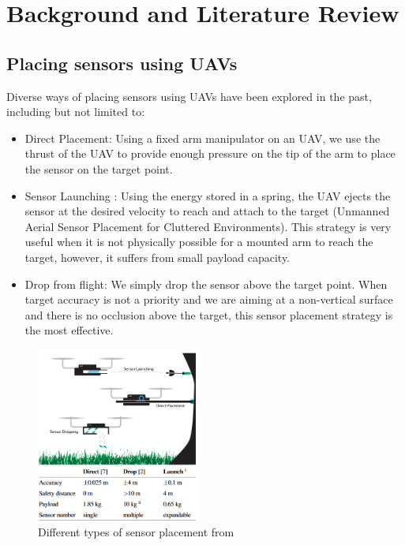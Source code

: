 \section{Background and Literature Review}
\subsection{Placing sensors using UAVs}
Diverse ways of placing sensors using UAVs have been explored in the past, including but not limited to: 
\begin{itemize}
    \item Direct Placement: Using a fixed arm manipulator on an UAV, we use the thrust of the UAV to provide enough pressure on the tip of the arm to place the sensor on the target point.
    \item Sensor Launching \cite{farinha2020unmanned}: Using the energy stored in a spring, the UAV ejects the sensor at the desired velocity to reach and attach to the target (Unmanned Aerial Sensor Placement for Cluttered Environments). This strategy is very useful when it is not physically possible for a mounted arm to reach the target, however, it suffers from small payload capacity.
    \item Drop from flight: We simply drop the sensor above the target point. When target accuracy is not a priority and we are aiming at a non-vertical surface and there is no occlusion above the target,  this sensor placement strategy is the most effective. 
\end{itemize}
\begin{figure}[h!]
    \centering
    \includegraphics[width=0.48\textwidth]{Images/threeway.png}
    \caption{Different types of sensor placement from \cite{farinha2020unmanned}}
    \label{fig:threeway}
\end{figure}

